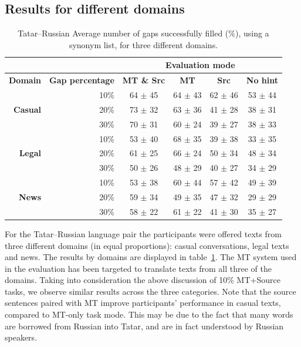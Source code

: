 \documentclass[11pt]{article}
\begin{document}
\subsection{Results for different domains}
\begin{table}
\centering
\begin{tabular}{|r|r |*{4}{c}|}
\hline
\multicolumn{2}{|c|}{} &\multicolumn{4}{c|}{\textbf{Evaluation mode}}\\
\hline
\textbf{Domain} & \textbf{Gap percentage} & \textbf{MT \& Src} & \textbf{MT} & \textbf{Src} & \textbf{No hint} \\
\hline
 \multirow{3}{*}{\textbf{Casual}} &
10\%&64 \(\pm\) 45&64 \(\pm\) 43&62 \(\pm\) 46&53 \(\pm\) 44\\
& 20\%&73 \(\pm\) 32&63 \(\pm\) 36&41 \(\pm\) 28&38 \(\pm\) 31\\
& 30\%&70 \(\pm\) 31&60 \(\pm\) 24&39 \(\pm\) 27&38 \(\pm\) 33\\
\hline
 \multirow{3}{*}{\textbf{Legal}} &
10\%&53 \(\pm\) 40&68 \(\pm\) 35&39 \(\pm\) 38&33 \(\pm\) 35\\
&20\%&61 \(\pm\) 25&66 \(\pm\) 24&50 \(\pm\) 34&48 \(\pm\) 34\\
&30\%&50 \(\pm\) 26&48 \(\pm\) 29&40 \(\pm\) 27&34 \(\pm\) 29\\
\hline
 \multirow{3}{*}{\textbf{News}} &
10\%&53 \(\pm\) 38&60 \(\pm\) 44&57 \(\pm\) 42&49 \(\pm\) 39\\
&20\%&59 \(\pm\) 34&49 \(\pm\) 35&47 \(\pm\) 32&29 \(\pm\) 29\\
&30\%&58 \(\pm\) 22&61 \(\pm\) 22&41 \(\pm\) 30&35 \(\pm\) 27\\
\hline

\end{tabular}
\caption{Tatar--Russian Average number of gaps successfully filled (\%), using a synonym list, for three different domains.} 
\label{table:rus} 
\end{table}

For the Tatar--Russian language pair the participants were offered texts from three different domains (in equal proportions): casual conversations, legal texts and news. The results by domains are displayed in table~\ref{table:rus}. The MT system used in the evaluation has been targeted to translate texts from all three of the domains. Taking into consideration the above discussion of 10\% MT+Source tasks, we observe similar results across the three categories. Note that the source sentences paired with MT improve participants' performance in casual texts, compared to MT-only task mode. This may be due to the fact that many words are borrowed from Russian into Tatar, and are in fact understood by Russian speakers.
\end{document}
